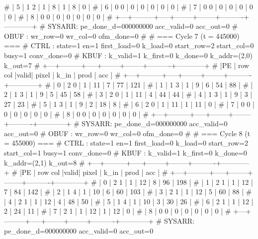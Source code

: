 # | 5 |   1   2 |  1  |      8 |      1 |        8 |          0 |
# | 6 |   0   0 |  0  |      0 |      0 |        0 |          0 |
# | 7 |   0   0 |  0  |      0 |      0 |        0 |          0 |
# | 8 |   0   0 |  0  |      0 |      0 |        0 |          0 |
# +---+---------+-----+--------+--------+----------+------------+
# SYSARR: pe_done_d=000000000 acc_valid=0 acc_out=0
# OBUF : wr_row=0 wr_col=0 ofm_done=0
# 
# === Cycle 7  (t = 445000) ===
# CTRL : state=1 en=1 first_load=0 k_load=0 start_row=2 start_col=0 busy=1 conv_done=0
# KBUF : k_valid=1 k_first=0 k_done=0 k_addr=(2,0) k_out=7
# +---+---------+-----+--------+--------+----------+------------+
# |PE | row col |valid| pixel  |  k_in  |   prod   |    acc     |
# +---+---------+-----+--------+--------+----------+------------+
# | 0 |   2   0 |  1  |     11 |      7 |       77 |        121 |
# | 1 |   1   3 |  1  |      9 |      6 |       54 |         88 |
# | 2 |   1   3 |  1  |      9 |      5 |       45 |         58 |
# | 3 |   2   0 |  1  |     11 |      4 |       44 |         44 |
# | 4 |   1   3 |  1  |      9 |      3 |       27 |         23 |
# | 5 |   1   3 |  1  |      9 |      2 |       18 |          8 |
# | 6 |   2   0 |  1  |     11 |      1 |       11 |          0 |
# | 7 |   0   0 |  0  |      0 |      0 |        0 |          0 |
# | 8 |   0   0 |  0  |      0 |      0 |        0 |          0 |
# +---+---------+-----+--------+--------+----------+------------+
# SYSARR: pe_done_d=000000000 acc_valid=0 acc_out=0
# OBUF : wr_row=0 wr_col=0 ofm_done=0
# 
# === Cycle 8  (t = 455000) ===
# CTRL : state=1 en=1 first_load=0 k_load=0 start_row=2 start_col=1 busy=1 conv_done=0
# KBUF : k_valid=1 k_first=0 k_done=0 k_addr=(2,1) k_out=8
# +---+---------+-----+--------+--------+----------+------------+
# |PE | row col |valid| pixel  |  k_in  |   prod   |    acc     |
# +---+---------+-----+--------+--------+----------+------------+
# | 0 |   2   1 |  1  |     12 |      8 |       96 |        198 |
# | 1 |   2   1 |  1  |     12 |      7 |       84 |        142 |
# | 2 |   1   4 |  1  |     10 |      6 |       60 |        103 |
# | 3 |   2   1 |  1  |     12 |      5 |       60 |         88 |
# | 4 |   2   1 |  1  |     12 |      4 |       48 |         50 |
# | 5 |   1   4 |  1  |     10 |      3 |       30 |         26 |
# | 6 |   2   1 |  1  |     12 |      2 |       24 |         11 |
# | 7 |   2   1 |  1  |     12 |      1 |       12 |          0 |
# | 8 |   0   0 |  0  |      0 |      0 |        0 |          0 |
# +---+---------+-----+--------+--------+----------+------------+
# SYSARR: pe_done_d=000000000 acc_valid=0 acc_out=0
